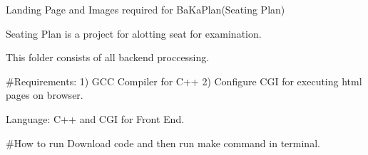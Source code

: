 Landing Page and Images required for Ba\-Ka\-Plan(\-Seating Plan)

Seating Plan is a project for alotting seat for examination.

This folder consists of all backend proccessing.

\#\-Requirements\-: 1) G\-C\-C Compiler for C++  2) Configure C\-G\-I for executing html pages on browser. 

Language\-: C++ and C\-G\-I for Front End. 

\#\-How to run Download code and then run make command in terminal. 